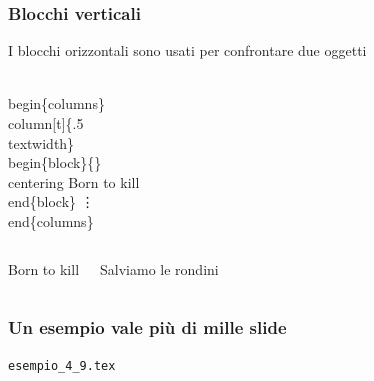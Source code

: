 \documentclass[svgnames,%
	ucs,%
	pdftex]{guitbeamer}
\begin{document}
\begin{frame}
  \frametitle{Blocchi verticali}
	I blocchi orizzontali sono usati per confrontare due oggetti 
	\begin{LaTeXcode}
		\\begin\{columns\}\n
		\hspace*{5ex}\\column[t]\{.5\\textwidth\}\n
		\hspace*{10ex}\\begin\{block\}\{\}\n
		\hspace*{10ex}\alert{\\centering}\n
		\hspace*{15ex} Born to kill\n
		\hspace*{10ex}\\end\{block\}\n
		\hspace*{15ex}\vdots\n
		\\end\{columns\}	
	\end{LaTeXcode}
	\begin{columns}
	  \column[t]{.5\textwidth}
		\begin{block}{}
		\centering
		Born to kill
		\end{block}
	  \column[t]{.5\textwidth}
		\begin{block}{}
		\centering
		Salviamo le rondini
		\end{block}
	\end{columns}
\end{frame}
\begin{frame}
  \frametitle{Un esempio vale pi\`u di mille slide}
	\begin{center}
		\alert{\texttt{esempio\_4\_9.tex}}
	\end{center}
\end{frame}
\end{document}
